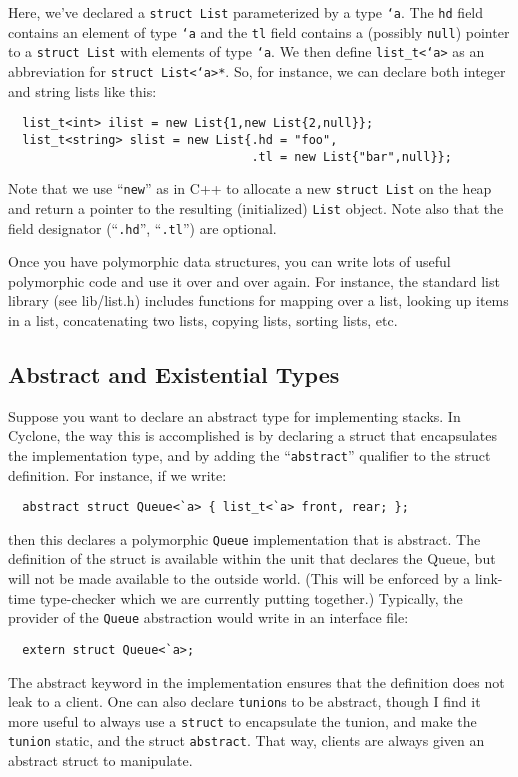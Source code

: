 Here, we've declared a \texttt{struct List} parameterized by a type
\texttt{`a}.  The \texttt{hd} field contains an element of type \texttt{`a}
and the \texttt{tl} field contains a (possibly \texttt{null}) pointer to a
\texttt{struct List} with elements of type \texttt{`a}.  We then define
\texttt{list_t<`a>} as an abbreviation for \texttt{struct List<`a>*}.  So,
for instance, we can declare both integer and string lists like this:
\begin{verbatim}
  list_t<int> ilist = new List{1,new List{2,null}};
  list_t<string> slist = new List{.hd = "foo",
                                  .tl = new List{"bar",null}};
\end{verbatim}

Note that we use ``\texttt{new}'' as in C++ to allocate a new
\texttt{struct List} on the heap and return a pointer to the resulting
(initialized) \texttt{List} object.  Note also that the field designator
(``\texttt{.hd}'', ``\texttt{.tl}'') are optional.

Once you have polymorphic data structures, you can write lots of
useful polymorphic code and use it over and over again.  For instance,
the standard list library (see lib/list.h) includes functions for
mapping over a list, looking up items in a list, concatenating two
lists, copying lists, sorting lists, etc.

\subsection{Abstract and Existential Types}
Suppose you want to declare an abstract type for implementing stacks.
In Cyclone, the way this is accomplished is by declaring a struct that
encapsulates the implementation type, and by adding the
``\texttt{abstract}'' qualifier to the struct definition.  For instance,
if we write:
\begin{verbatim}
  abstract struct Queue<`a> { list_t<`a> front, rear; };
\end{verbatim}
then this declares a polymorphic \texttt{Queue} implementation that is
abstract.  The definition of the struct is available within the unit
that declares the Queue, but will not be made available to the outside
world.  (This will be enforced by a link-time type-checker which we
are currently putting together.)  Typically, the provider of the
\texttt{Queue} abstraction would write in an interface file:
\begin{verbatim}
  extern struct Queue<`a>;
\end{verbatim}
The abstract keyword in the implementation ensures that the definition
does not leak to a client.  One can also declare \texttt{tunion}s to be
abstract, though I find it more useful to always use a \texttt{struct}
to encapsulate the tunion, and make the \texttt{tunion} static, and the
struct \texttt{abstract}.  That way, clients are always given an
abstract struct to manipulate.

